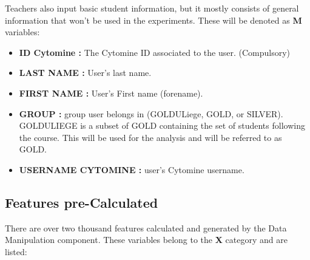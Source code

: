 \documentclass[a4paper,11pt]{report}
\numberwithin{figure}{section} %
\begin{document}
    Teachers also input basic student information, but it mostly consists of general information that won't be used in the experiments.
    These will be denoted as \textbf{M} variables:
   	\begin{itemize}
   	\item[\textbullet] \textbf{ID Cytomine :} The Cytomine ID associated to the user. (Compulsory)
    \item[\textbullet] \textbf{LAST NAME :} User's last name.
    \item[\textbullet] \textbf{FIRST NAME :} User's First name (forename).
    \item[\textbullet] \textbf{GROUP :} group user belongs in (GOLDULiege, GOLD, or SILVER).
    GOLDULIEGE is a subset of GOLD containing the set of students following the course.
    This will be used for the analysis and will be referred to as GOLD.
    \item[\textbullet] \textbf{USERNAME CYTOMINE :} user's Cytomine username.
   	\end{itemize}


    \subsection{Features pre-Calculated}

    There are over two thousand features calculated and generated by the Data Manipulation component.
    These variables belong to the \textbf{X} category and are listed:
\end{document}
